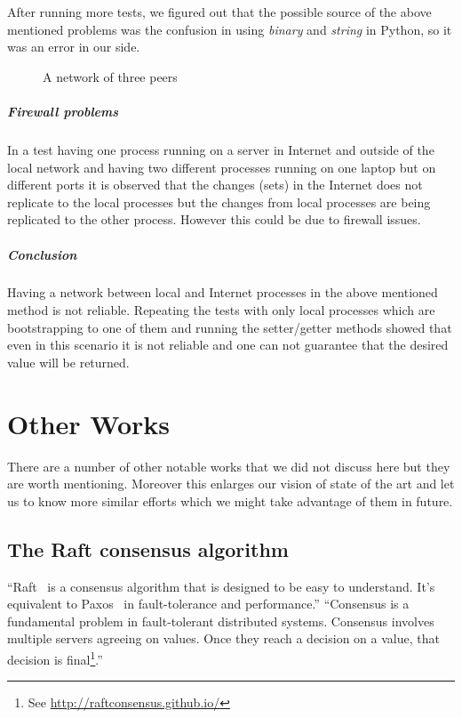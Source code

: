After running more tests, we figured out that the possible source of the above mentioned problems 
was the confusion in using \textit{binary} and \textit{string} in Python, so it was an error in our side.

\begin{figure}
\centering
{}
\caption{A network of three peers}
\label{fig:threepeers}
\end{figure}


\subparagraph{Firewall problems}
In a test having one process running on a server in Internet and outside of the local network and having two
different processes running on one laptop but on different ports it is observed that the changes (sets) in the
Internet does not replicate to the local processes but the changes from local processes are being replicated to the other process.
However this could be due to firewall issues.

\subparagraph{Conclusion}
Having a network between local and Internet processes in the above mentioned method is not reliable. 
Repeating the tests with only local processes which are bootstrapping to one of them and running the setter/getter
methods showed that even in this scenario it is not reliable and one can not guarantee that the desired value will be returned.

\section{Other Works}
There are a number of other notable works that we did not discuss here but they are worth mentioning.
Moreover this enlarges our vision of state of the art and let us to know more similar efforts 
which we might take advantage of them in future.

\subsection{The Raft consensus algorithm}
``Raft~\cite{ongaro2014search} is a consensus algorithm that is designed to be easy to understand. 
It's equivalent to Paxos~\cite{Lamport:1998:PP:279227.279229} in fault-tolerance and performance.''
``Consensus is a fundamental problem in fault-tolerant distributed systems.
Consensus involves multiple servers agreeing on values. Once they reach a decision on a value, that decision is 
final\footnote{See \url{http://raftconsensus.github.io/}}.''


